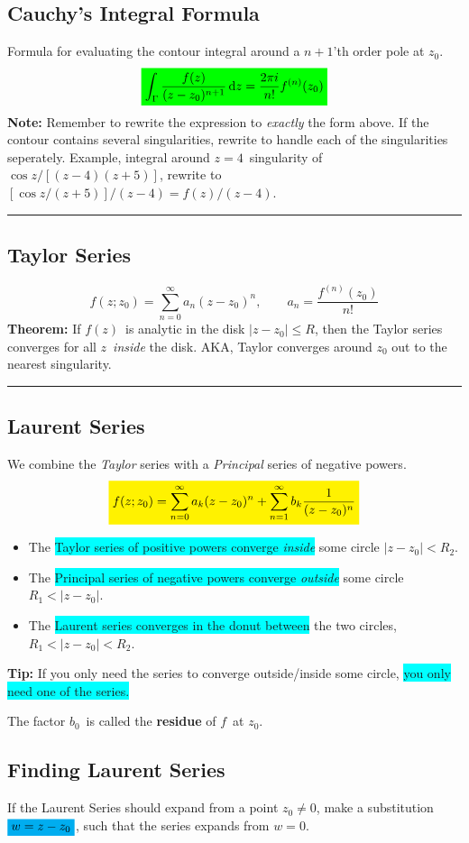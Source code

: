 \documentclass[10pt,a4paper]{article}
\newcommand{\holine}{\rule{286pt}{1pt}}
\newcommand{\yl}[1]{\colorbox{yellow}{$\displaystyle #1$}}
\newcommand{\gr}[1]{\colorbox{green}{$\displaystyle #1$}}
\newcommand{\bl}[1]{\colorbox{cyan}{$\displaystyle #1$}}
\newcommand{\bll}{\colorbox{cyan}}
\begin{document}
\begin{multicols}{2}
\subsection*{Cauchy's Integral Formula}
Formula for evaluating the contour integral around a $n+1$'th order pole at $z_0$.
\[\gr{
    \int_\Gamma \frac{f(z)}{(z-z_0)^{n+1}}\dd{z} = \frac{2\pi i}{n!}f^{(n)}(z_0)
}\]
\textbf{Note:} Remember to rewrite the expression to \textit{exactly} the form above. If the contour contains several singularities, rewrite to handle each of the singularities seperately. Example, integral around $z=4$ singularity of $\cos{z}/[(z-4)(z+5)]$, rewrite to $[\cos{z}/(z+5)]/(z-4) = f(z)/(z-4)$.



\holine
\subsection*{Taylor Series}
\[
    f(z; z_0) = \sum_{n=0}^\infty a_n(z-z_0)^n, \quad\quad a_n = \frac{f^{(n)}(z_0)}{n!}
\]
\textbf{Theorem:} If $f(z)$ is analytic in the disk $|z-z_0| \leq R$, then the Taylor series converges for all $z$ \textit{inside} the disk. AKA, Taylor converges around $z_0$ out to the nearest singularity.



\holine
\subsection*{Laurent Series}
We combine the \textit{Taylor} series with a \textit{Principal} series of negative powers.
\[
\yl{
    f(z; z_0) = \sum_{n=0}^\infty a_k(z-z_0)^n + \sum_{n=1}^\infty b_k\frac{1}{(z-z_0)^n}
}
\]
\begin{itemize}
    \item The \bll{Taylor series of positive powers converge \textit{inside}} some circle $|z-z_0| < R_2$.
    \item The \bll{Principal series of negative powers converge \textit{outside}} some circle $R_1 < |z-z_0|$.
    \item The \bll{Laurent series converges in the donut between} the two circles, $R_1 < |z-z_0| < R_2$.
\end{itemize}
\textbf{Tip:} If you only need the series to converge outside/inside some circle, \bll{you only need one of the series.}

The factor $b_0$ is called the \textbf{residue} of $f$ at $z_0$.

\subsection*{Finding Laurent Series}
If the Laurent Series should expand from a point $z_0 \neq 0$, make a substitution $\bl{w = z - z_0}$, such that the series expands from $w=0$.


\end{multicols}
\end{document}
